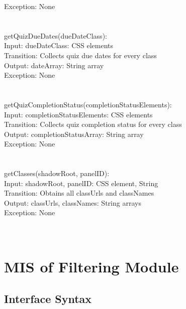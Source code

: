 \documentclass[12pt, titlepage]{article}
\begin{document}
    Exception: None\\
\\
\\
getQuizDueDates(dueDateClass):\\
    
    Input: dueDateClass: CSS elements\\
    
    Transition: Collects quiz due dates for every class\\
    
    Output: dateArray: String array\\
    
    Exception: None\\
\\
\\
getQuizCompletionStatus(completionStatusElements):\\
    
    Input: completionStatusElements: CSS elements\\
    
    Transition: Collects quiz completion status for every class\\
    
    Output: completionStatusArray: String array\\
    
    Exception: None\\
\\
\\
getClasses(shadowRoot, panelID):\\
    
    Input: shadowRoot, panelID: CSS element, String\\
    
    Transition: Obtains all classUrls and classNames\\
    
    Output: classUrls, classNames: String arrays\\
    
    Exception: None\\
\\
\\

\newpage





\section{MIS of Filtering Module}
\subsection{Interface Syntax}
\end{document}
